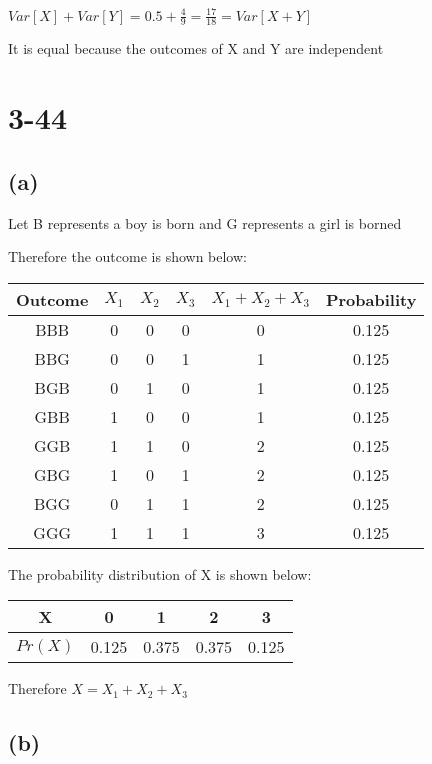 \documentclass[12pt]{article}
\begin{document}
\begin{spacing}{2.0}
$Var[X]+Var[Y]= 0.5+ \frac{4}{9} =\frac{17}{18} = Var[X+Y]$

It is equal because the outcomes of X and Y are independent

\section*{3-44}

\subsection*{(a)}

Let B represents a boy is born and G represents a girl is borned

Therefore the outcome is shown below:

\begin{tabular}{|c|c|c|c|c|c|}
  \hline
  Outcome & $X_1$ & $X_2$ & $X_3$ & $X_1+X_2+X_3$ & Probability \\
  \hline
  BBB & 0 & 0 & 0 & 0 & 0.125 \\
  \hline
  BBG & 0 & 0 & 1 & 1 & 0.125 \\
  \hline
  BGB & 0 & 1 & 0 & 1 & 0.125 \\
  \hline
  GBB & 1 & 0 & 0 & 1 & 0.125 \\
  \hline
  GGB & 1 & 1 & 0 & 2 & 0.125 \\
  \hline
  GBG & 1 & 0 & 1 & 2 & 0.125 \\
  \hline
  BGG & 0 & 1 & 1 & 2 & 0.125 \\
  \hline
  GGG & 1 & 1 & 1 & 3 & 0.125 \\
  \hline
\end{tabular}

The probability distribution of X is shown below:

\begin{tabular}{|c|c|c|c|c|}
  \hline
  X & 0 & 1 & 2 & 3 \\
  \hline
  $Pr(X)$ & 0.125 & 0.375 & 0.375 & 0.125 \\
  \hline
\end{tabular}

Therefore $X=X_1+X_2+X_3$

\subsection*{(b)}


\end{spacing}
\end{document}
